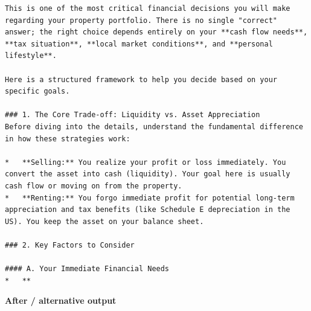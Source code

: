 \begin{Verbatim}
This is one of the most critical financial decisions you will make regarding your property portfolio. There is no single "correct" answer; the right choice depends entirely on your **cash flow needs**, **tax situation**, **local market conditions**, and **personal lifestyle**.

Here is a structured framework to help you decide based on your specific goals.

### 1. The Core Trade-off: Liquidity vs. Asset Appreciation
Before diving into the details, understand the fundamental difference in how these strategies work:

*   **Selling:** You realize your profit or loss immediately. You convert the asset into cash (liquidity). Your goal here is usually cash flow or moving on from the property.
*   **Renting:** You forgo immediate profit for potential long-term appreciation and tax benefits (like Schedule E depreciation in the US). You keep the asset on your balance sheet.

### 2. Key Factors to Consider

#### A. Your Immediate Financial Needs
*   **
\end{Verbatim}

\textbf{After / alternative output}

